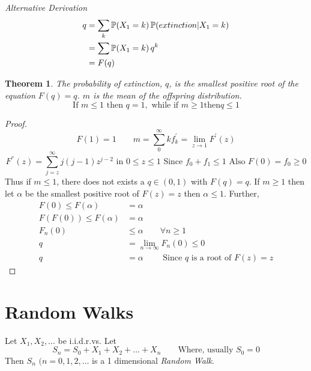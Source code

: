 \documentclass{notes}
\theoremstyle{plain}
\newtheorem{theorem}{Theorem}[chapter]
\newcommand{\bP}{\mathbb{P}}
\newcommand{\prob}[1]{\bP \negthinspace\left(#1\right)}
\begin{document}
\emph{Alternative Derivation}
\begin{align*}
q &= \sum_k \prob{X_1 = k}\prob{extinction|X_1=k}\\
&= \sum \prob{X_1 = k}q^k\\
&= F(q)
\end{align*}
\begin{theorem}
 The probability of extinction, $q$, is the smallest positive root of the
 equation $ F(q)  = q $. $m$ is the mean of the offspring distribution.
\[
\text{If } m\leq 1 \text{ then } q=1,\text{ while if }m\ge 1\text{then}q\le1 
\]
\end{theorem}
\begin{proof}
\[
F(1)=1 \qquad m=\sum_0^\infty k f^{'}_k = \lim_{z\to1}F^{'}(z)
\]
\[
F^{''}(z) = \sum_{j=z}^\infty j(j-1)z^{j-2} \text{ in } 0\le z\le1
\text{ Since } f_0+f_1 \le 1\text{ Also } F(0) =f_0 \ge 0
\]
\vspace{3in}
Thus if $m\leq 1$, there does not exists a $q \in(0,1)$ with $ F(q)  = q $. If
$m\ge1$ then let $\alpha$ be the smallest positive root of $ F(z)=z$
then $\alpha \le 1$. Further,
\begin{align*}
F(0)\le F(\alpha) &= \alpha\\
F(F(0)) \le F(\alpha) &= \alpha\\
F_n(0) &\leq \alpha \qquad \forall n \geq 1\\
q &= \lim_{n\to\infty}F_n(0) \leq 0\\
q &= \alpha \qquad \text{ Since $q$ is a root of $F(z)=z$}
\end{align*}
\end{proof}
\section{Random Walks}
Let $X_1,X_2,\dots$ be i.i.d.r.vs. Let 
\[
S_n = S_0 +X_1+X_2+\dots +X_n \qquad \text{Where, usually $S_0 =0$}
\]
Then $S_n$ $(n=0,1,2,\dots$ is a 1 dimensional \emph{Random Walk}.
\end{document}
